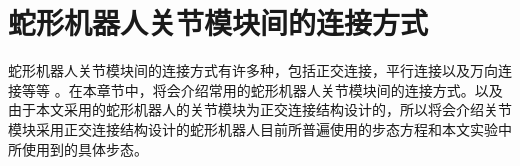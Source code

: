 %
%
%
\section{蛇形机器人关节模块间的连接方式}
蛇形机器人关节模块间的连接方式有许多种，包括正交连接，平行连接以及万向连接等等 。在本章节中，将会介绍常用的蛇形机器人关节模块间的连接方式。以及由于本文采用的蛇形机器人的关节模块为正交连接结构设计的，所以将会介绍关节模块采用正交连接结构设计的蛇形机器人目前所普遍使用的步态方程和本文实验中所使用到的具体步态。
